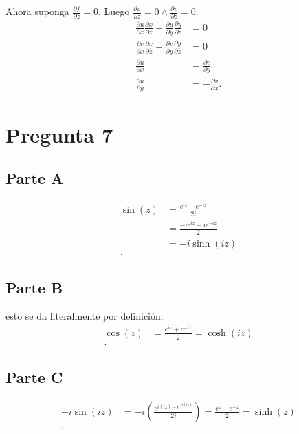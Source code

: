 \documentclass[12pt]{exam}
\begin{document}
Ahora suponga $\frac{\partial f}{\partial z} = 0$. Luego $\frac{\partial u}{\partial \overline{z}} = 0 \land \frac{\partial v}{\partial \overline{z}} =0$.
\begin{align*}
  \frac{\partial u}{\partial x} \frac{\partial x}{\partial \overline{z}} + \frac{\partial u}{\partial y} \frac{\partial y}{\partial \overline{z}} &= 0\\
  \frac{\partial v}{\partial x} \frac{\partial x}{\partial \overline{z}} + \frac{\partial v}{\partial y} \frac{\partial y}{\partial \overline{z}} &= 0 \\
  \frac{\partial u}{\partial x} &= \frac{\partial v}{\partial y}  \\
  \frac{\partial u}{\partial y} &= - \frac{\partial v}{\partial x} 
.\end{align*}

\section*{Pregunta 7}

\subsection*{Parte A}

\begin{align*}
  \sin\left( z \right) &= \frac{e^{iz}-e^{-iz}}{2i}\\
  &= \frac{-ie^{iz}+ie^{-iz}}{2} \\
  &= -i \sinh\left( iz \right)  \\
.\end{align*}

\subsection*{Parte B}
esto se da literalmente por definición:
\begin{align*}
  \cos\left( z \right) &= \frac{e^{iz}+e^{-iz}}{2} = \cosh\left( iz \right)  \\
.\end{align*}
\subsection*{Parte C}
\begin{align*}
  -i\sin\left( iz \right) &= -i\left( \frac{e^{i\left( iz \right) -e^{-i\left( iz \right) }}}{2i} \right) = \frac{e^{z}-e^{-z}}{2}=\sinh\left( z \right)  \\
.\end{align*}
\end{document}
